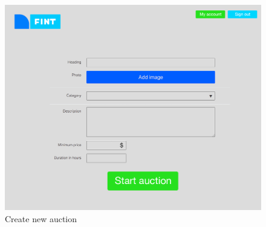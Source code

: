 \begin{figure}
	\caption{Create new auction}
	\centering
		\includegraphics[scale=0.38]{figures/Create-new-auction}
\end{figure}



